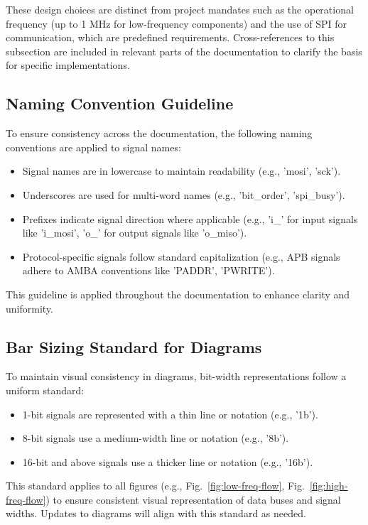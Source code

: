 These design choices are distinct from project mandates such as the operational frequency (up to 1 MHz for low-frequency components) and the use of SPI for communication, which are predefined requirements. Cross-references to this subsection are included in relevant parts of the documentation to clarify the basis for specific implementations.

\subsection{Naming Convention Guideline}

To ensure consistency across the documentation, the following naming conventions are applied to signal names:
\begin{itemize}[nosep]
    \item Signal names are in lowercase to maintain readability (e.g., 'mosi', 'sck').
    \item Underscores are used for multi-word names (e.g., 'bit\_order', 'spi\_busy').
    \item Prefixes indicate signal direction where applicable (e.g., 'i\_' for input signals like 'i\_mosi', 'o\_' for output signals like 'o\_miso').
    \item Protocol-specific signals follow standard capitalization (e.g., APB signals adhere to AMBA conventions like 'PADDR', 'PWRITE').
\end{itemize}
This guideline is applied throughout the documentation to enhance clarity and uniformity.

\subsection{Bar Sizing Standard for Diagrams}

To maintain visual consistency in diagrams, bit-width representations follow a uniform standard:
\begin{itemize}[nosep]
    \item 1-bit signals are represented with a thin line or notation (e.g., '1b').
    \item 8-bit signals use a medium-width line or notation (e.g., '8b').
    \item 16-bit and above signals use a thicker line or notation (e.g., '16b').
\end{itemize}
This standard applies to all figures (e.g., Fig.~\ref{fig:low-freq-flow}, Fig.~\ref{fig:high-freq-flow}) to ensure consistent visual representation of data buses and signal widths. Updates to diagrams will align with this standard as needed.

